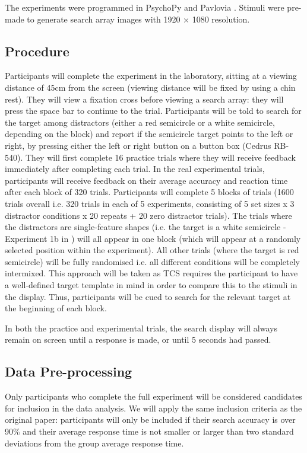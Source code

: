 \documentclass[preprint,12pt,authoryear]{elsarticle}
\begin{document}
The experiments were programmed in PsychoPy and Pavlovia \citep{peirce2019psychopy2}. Stimuli were pre-made to generate search array images with 1920 $\times$ 1080 resolution. 

\subsection{Procedure}

Participants will complete the experiment in the laboratory, sitting at a viewing distance of 45cm from the screen (viewing distance will be fixed by using a chin rest). They will view a fixation cross before viewing a search array: they will press the space bar to continue to the trial. Participants will be told to search for the target among distractors (either a red semicircle or a white semicircle, depending on the block) and report if the semicircle target points to the left or right, by pressing either the left or right button on a button box (Cedrus RB-540). They will first complete 16 practice trials where they will receive feedback immediately after completing each trial. In the real experimental trials, participants will receive feedback on their average accuracy and reaction time after each block of 320 trials. Participants will complete 5 blocks of trials (1600 trials overall i.e. 320 trials in each of 5 experiments, consisting of 5 set sizes x 3 distractor conditions x 20 repeats + 20 zero distractor trials). The trials where the distractors are single-feature shapes (i.e. the target is a white semicircle - Experiment 1b in \cite{buetti2019predicting}) will all appear in one block (which will appear at a randomly selected position within the experiment). All other trials (where the target is red semicircle) will be fully randomised i.e. all different conditions will be completely intermixed. This approach will be taken as TCS requires the participant to have a well-defined target template in mind in order to compare this to the stimuli in the display. Thus, participants will be cued to search for the relevant target at the beginning of each block.

In both the practice and experimental trials, the search display will always remain on screen until a response is made, or until 5 seconds had passed. 

\subsection{Data Pre-processing}

Only participants who complete the full experiment will be considered candidates for inclusion in the data analysis. We will apply the same inclusion criteria as the original paper: participants will only be included if their search accuracy is over 90\% and their average response time is not smaller or larger than two standard deviations from the group average response time. 
\end{document}
